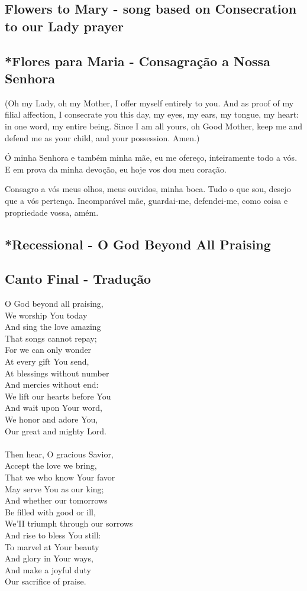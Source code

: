 \documentclass[10pt,a4]{article}
\newcommand \subsect[2] {\subsection*{#1} \switchcolumn \subsection*{#2} \switchcolumn*}
\begin{document}
\begin{paracol}{2}

\subsect{Flowers to Mary - song based on Consecration to our Lady prayer}{*Flores para Maria - Consagra\c{c}\~ao a Nossa Senhora}

(Oh my Lady, oh my Mother,
I offer myself entirely to you.
And as proof of my filial affection,
I consecrate you this day,
my eyes, my ears, my tongue, my heart:
in one word, my entire being.
Since I am all yours,
oh Good Mother,
keep me and defend me as your child,
and your possession. Amen.)

\switchcolumn

Ó minha Senhora e também minha mãe,
eu me ofereço, inteiramente todo a vós.
E em prova da minha devoção,
eu hoje vos dou meu coração.

Consagro a vós meus olhos, meus ouvidos, minha boca.
Tudo o que sou, desejo que a vós pertença.
Incomparável mãe, guardai-me, defendei-me,
como coisa e propriedade vossa, amém.

\switchcolumn*

\subsect{*Recessional - O God Beyond All Praising}{Canto Final - Tradu\c{c}\~ao}

O God beyond all praising,\\
We worship You today\\
And sing the love amazing\\
That songs cannot repay;\\
For we can only wonder\\
At every gift You send,\\
At blessings without number\\
And mercies without end:\\
We lift our hearts before You\\
And wait upon Your word,\\
We honor and adore You,\\
Our great and mighty Lord.\\
\\
Then hear, O gracious Savior,\\
Accept the love we bring,\\
That we who know Your favor\\
May serve You as our king;\\
And whether our tomorrows\\
Be filled with good or ill,\\
We'II triumph through our sorrows\\
And rise to bless You still:\\
To marvel at Your beauty\\
And glory in Your ways,\\
And make a joyful duty\\
Our sacrifice of praise.


\end{paracol}
\end{document}
